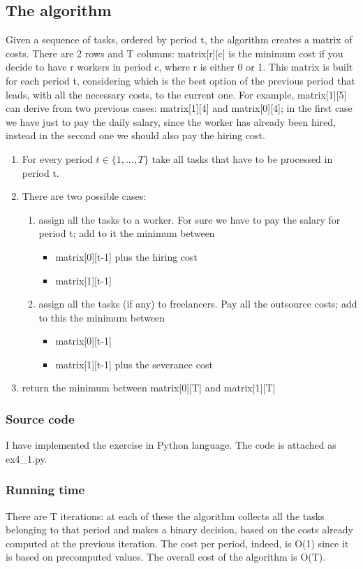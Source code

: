 \subsection{The algorithm}
Given a sequence of tasks, ordered by period t, the algorithm creates a matrix of costs. There are 2 rows and T columns: matrix[r][c] is the minimum cost if you decide to have r workers in period c, where r is either 0 or 1. This matrix is built for each period t, considering which is the best option of the previous period that leads, with all the necessary costs, to the current one. For example, matrix[1][5] can derive from two previous cases: matrix[1][4] and matrix[0][4]; in the first case we have just to pay the daily salary, since the worker has already been hired, instead in the second one we should also pay the hiring cost.
\begin{enumerate}
	\item For every period $t \in \{1,..., T\}$ take all tasks that have to be processed in period t.
	\item There are two possible cases:
	\begin{enumerate}
		\item assign all the tasks to a worker. For sure we have to pay the salary for period t; add to it the minimum between
		\begin{itemize}
			\item matrix[0][t-1] plus the hiring cost
			\item matrix[1][t-1]
		\end{itemize} 
		\item assign all the tasks (if any) to freelancers. Pay all the outsource costs; add to this the minimum between
		\begin{itemize}
			\item matrix[0][t-1]
			\item matrix[1][t-1] plus the severance cost
		\end{itemize}
	\end{enumerate}
	\item return the minimum between matrix[0][T] and matrix[1][T]
\end{enumerate}

\subsubsection{Source code}
I have implemented the exercise in Python language. The code is attached as ex4\_1.py.

\subsubsection{Running time}
There are T iterations: at each of these the algorithm collects all the tasks belonging to that period and makes a binary decision, based on the costs already computed at the previous iteration. The cost per period, indeed, is O(1) since it is based on precomputed values. The overall cost of the algorithm is O(T).

